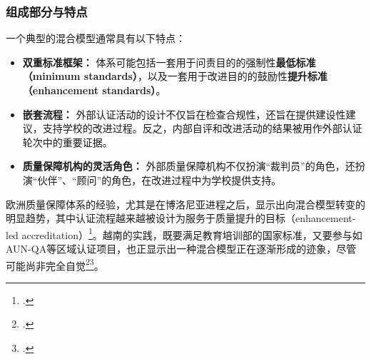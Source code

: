 \subsubsection{组成部分与特点}
一个典型的混合模型通常具有以下特点：
\begin{itemize}
    \item \textbf{双重标准框架：} 体系可能包括一套用于问责目的的强制性\textbf{最低标准（minimum standards）}，以及一套用于改进目的的鼓励性\textbf{提升标准（enhancement standards）}。
    \item \textbf{嵌套流程：} 外部认证活动的设计不仅旨在检查合规性，还旨在提供建设性建议，支持学校的改进过程。反之，内部自评和改进活动的结果被用作外部认证轮次中的重要证据。
    \item \textbf{质量保障机构的灵活角色：} 外部质量保障机构不仅扮演“裁判员”的角色，还扮演“伙伴”、“顾问”的角色，在改进过程中为学校提供支持。
\end{itemize}
欧洲质量保障体系的经验，尤其是在博洛尼亚进程之后，显示出向混合模型转变的明显趋势，其中认证流程越来越被设计为服务于质量提升的目标（enhancement-led accreditation）\footcite{EUA_Integration}。越南的实践，既要满足教育培训部的国家标准，又要参与如AUN-QA等区域认证项目，也正显示出一种混合模型正在逐渐形成的迹象，尽管可能尚非完全自觉\footcite{VNU-CEA2023}\footcite{HangNguyen2017}。















